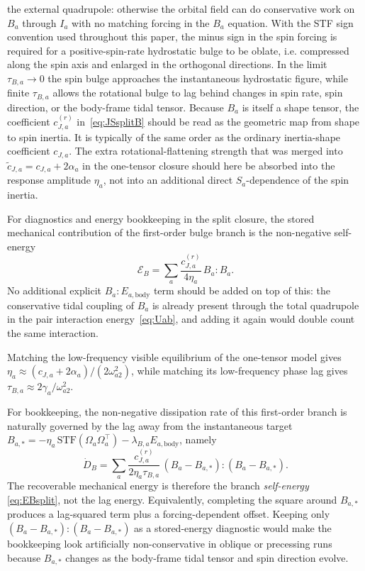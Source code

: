 \documentclass[journal, a4paper]{IEEEtran}
\begin{document}
the external quadrupole: otherwise the orbital field can do conservative work on
$B_a$ through $I_a$ with no matching forcing in the $B_a$ equation. With the STF
sign convention used throughout this paper, the minus sign in the spin forcing is
required for a positive-spin-rate hydrostatic bulge to be oblate, i.e. compressed
along the spin axis and enlarged in the orthogonal directions. In the limit
$\tau_{B,a}\to 0$ the spin bulge approaches the instantaneous hydrostatic figure,
while finite $\tau_{B,a}$ allows the rotational bulge to lag behind changes in
spin rate, spin direction, or the body-frame tidal tensor. Because $B_a$ is
itself a shape tensor, the coefficient $c_{J,a}^{(r)}$ in~\eqref{eq:JSsplitB}
should be read as the geometric map from shape to spin inertia. It is typically
of the same order as the ordinary inertia-shape coefficient $c_{J,a}$. The extra
rotational-flattening strength that was merged into
$\tilde c_{J,a}=c_{J,a}+2\alpha_a$ in the one-tensor closure should here be
absorbed into the response amplitude $\eta_a$, not into an additional direct
$S_a$-dependence of the spin inertia.

For diagnostics and energy bookkeeping in the split closure, the stored
mechanical contribution of the first-order bulge branch is the non-negative
self-energy
\begin{equation}
\mathcal E_B
= \sum_a \frac{c_{J,a}^{(r)}}{4\eta_a}\,B_a:B_a.
\label{eq:EBsplit}
\end{equation}
No additional explicit $B_a:E_{a,\mathrm{body}}$ term should be added on top of
this: the conservative tidal coupling of $B_a$ is already present through the
total quadrupole in the pair interaction energy~\eqref{eq:Uab}, and adding it
again would double count the same interaction.

Matching the low-frequency visible equilibrium of the one-tensor model gives
$\eta_a \approx (c_{J,a}+2\alpha_a)/(2\omega_{a2}^2)$, while matching its
low-frequency phase lag gives $\tau_{B,a}\approx 2\gamma_a/\omega_{a2}^2$.

For bookkeeping, the non-negative dissipation rate of this first-order branch is
naturally governed by the lag away from the instantaneous target
$B_{a,*}=-\eta_a\,\mathrm{STF}(\Omega_a\Omega_a^\top)-\lambda_{B,a}E_{a,\mathrm{body}}$,
namely
\begin{equation}
\dot D_B
= \sum_a \frac{c_{J,a}^{(r)}}{2\eta_a\tau_{B,a}}
\,(B_a-B_{a,*}):(B_a-B_{a,*}).
\end{equation}
The recoverable mechanical energy is therefore the branch \emph{self-energy}
\eqref{eq:EBsplit}, not the lag energy. Equivalently, completing the square
around $B_{a,*}$ produces a lag-squared term plus a forcing-dependent offset.
Keeping only $(B_a-B_{a,*}):(B_a-B_{a,*})$ as a stored-energy diagnostic would
make the bookkeeping look artificially non-conservative in oblique or
precessing runs because $B_{a,*}$ changes as the body-frame tidal tensor and
spin direction evolve.
\end{document}
